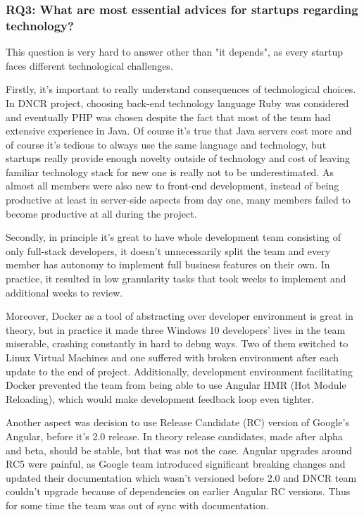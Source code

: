 \documentclass{article}
\begin{document}
\subsubsection{RQ3: What are most essential advices for startups regarding technology?}
This question is very hard to answer other than "it depends", as every startup faces different technological challenges.

Firstly, it's important to really understand consequences of technological choices. In DNCR project, choosing back-end technology language Ruby was considered and eventually PHP was chosen despite the fact that most of the team had extensive experience in Java. Of course it's true that Java servers cost more and of course it's tedious to always use the same language and technology, but startups really provide enough novelty outside of technology and cost of leaving familiar technology stack for new one is really not to be underestimated. As almost all members were also new to front-end development, instead of being productive at least in server-side aspects from day one, many members failed to become productive at all during the project.

Secondly, in principle it's great to have whole development team consisting of only full-stack developers, it doesn't unnecessarily split the team and every member has autonomy to implement full business features on their own. In practice, it resulted in low granularity tasks that took weeks to implement and additional weeks to review.

Moreover, Docker as a tool of abstracting over developer environment is great in theory, but in practice it made three Windows 10 developers' lives in the team miserable, crashing constantly in hard to debug ways. Two of them switched to Linux Virtual Machines and one suffered with broken environment after each update to the end of project. Additionally, development environment facilitating Docker prevented the team from being able to use Angular HMR (Hot Module Reloading), which would make development feedback loop even tighter.

Another aspect was decision to use Release Candidate (RC) version of Google's Angular, before it's 2.0 release. In theory release candidates, made after alpha and beta, should be stable, but that was not the case. Angular upgrades around RC5 were painful, as Google team introduced significant breaking changes and updated their documentation which wasn't versioned before 2.0 and DNCR team couldn't upgrade because of dependencies on earlier Angular RC versions. Thus for some time the team was out of sync with documentation.
\end{document}
